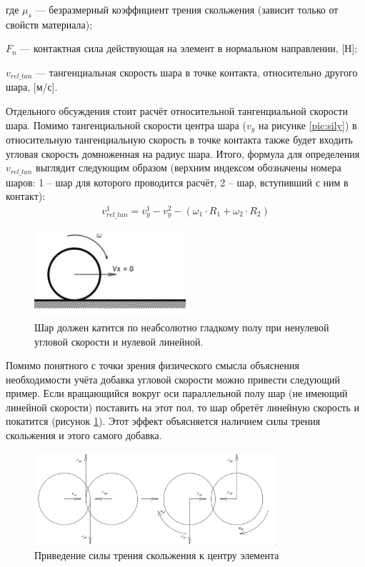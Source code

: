 \documentclass[utf8x, 14pt, oneside, a4paper]{article}
\begin{document}
где $\mu_s$ --- безразмерный коэффициент трения скольжения (зависит только от свойств материала);

$F_n$ --- контактная сила действующая на элемент в нормальном направлении, [Н];

$v_{rel\_tan}$ --- тангенциальная скорость шара в точке контакта, относительно другого шара, [м/с].


Отдельного обсуждения стоит расчёт относительной тангенциальной скорости шара. 
Помимо тангенциальной скорости центра шара ($v_y$ на рисунке \ref{pic:sily}) в относительную тангенциальную скорость в точке контакта также будет входить угловая скорость домноженная на радиус шара.
Итого, формула для определения $v_{rel\_tan}$ выглядит следующим образом (верхним индексом обозначены номера шаров: 1 -- шар для которого проводится расчёт, 2 -- шар, вступивший с ним в контакт):
\begin{align}
\label{rel_tan_velocity}
v_{rel\_tan}^{1} = v_{y}^{1} - v_{y}^{2} - \left( \omega_1 \cdot R_1 + \omega_2 \cdot R_2 \right)
\end{align}

\begin{figure}[H]
	\centering
	\includegraphics[width=0.5\textwidth]{pol_omega}
	\caption{Шар должен катится по неабсолютно гладкому полу при ненулевой угловой скорости и нулевой линейной.}
	\label{pic:pol_omega}
\end{figure} 

Помимо понятного с точки зрения физического смысла объяснения необходимости учёта добавка угловой скорости можно привести следующий пример. 
Если вращающийся вокруг оси параллельной полу шар (не имеющий линейной скорости) поставить на этот пол, то шар обретёт линейную скорость и покатится (рисунок \ref{pic:pol_omega}). 
Этот эффект объясняется наличием силы трения скольжения и этого самого добавка.

\begin{figure}[H]
	\centering
	\includegraphics[width=0.8\textwidth]{fs_ms}
	\caption{Приведение силы трения скольжения к центру элемента}
	\label{pic:fs_ms}
\end{figure} 
\end{document}
